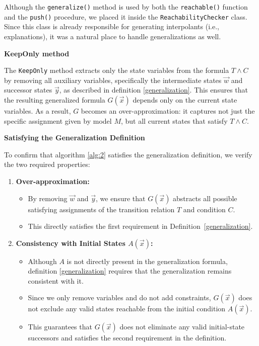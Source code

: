 Although the \texttt{generalize()} method is used by both the
\texttt{reachable()} function and the \texttt{push()} procedure, we placed it
inside the \texttt{ReachabilityChecker} class. Since this class is already
responsible for generating interpolants (i.e., explanations), it was a natural
place to handle generalizations as well.

\vspace{\baselineskip}
\noindent\textbf{KeepOnly method}

\vspace{\baselineskip}
\noindent The \texttt{KeepOnly} method extracts only the state variables from
the formula \( T \land C \) by removing all auxiliary variables, specifically
the intermediate states \( \vec{w} \) and successor states \( \vec{y} \), as
described in definition \ref{generalization}. This ensures that the resulting
generalized formula \( G(\vec{x}) \) depends only on the current state
variables. As a result, \( G \) becomes an over-approximation: it captures not
just the specific assignment given by model \( M \), but all current states
that satisfy \( T \land C \).

\newpage
\noindent\textbf{Satisfying the Generalization Definition}

\vspace{\baselineskip}
\noindent To confirm that algorithm \ref{alg:2}
satisfies the generalization definition, we verify
the two required properties:

\begin{enumerate}
    \item \textbf{Over-approximation:}
    \begin{itemize}
        \item By removing \( \vec{w} \) and \( \vec{y} \), we ensure that \( G(\vec{x}) \) abstracts all possible satisfying assignments of the transition relation \( T \) and condition \( C \).
        \item This directly satisfies the first requirement in Definition~\ref{generalization}.
    \end{itemize}

    \item \textbf{Consistency with Initial States \( A(\vec{x}) \):}
    \begin{itemize}
        \item Although \( A \) is not directly present in the generalization formula, definition \ref{generalization} requires that the generalization remains consistent with it.
        \item Since we only remove variables and do not add constraints, \( G(\vec{x}) \) does not exclude any valid states reachable from the initial condition \( A(\vec{x}) \).
        \item This guarantees that \( G(\vec{x}) \) does not eliminate any valid initial-state successors and satisfies the second requirement in the definition.
    \end{itemize}
\end{enumerate}

